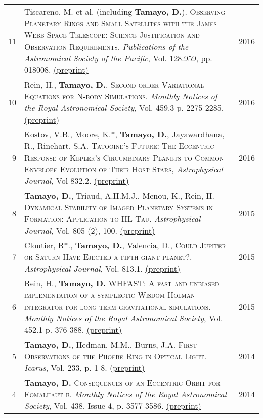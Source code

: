 \documentclass[10pt]{article} %
\begin{document}
\begin{tabular}{>{\hfill}r|p{14.3cm}l}
11 & Tiscareno, M. et al. (including {\bf Tamayo, D.}). \textsc{Observing Planetary Rings and Small Satellites with the James Webb Space Telescope: Science Justification and Observation Requirements}, {\it Publications of the Astronomical Society of the Pacific}, Vol. 128.959, pp. 018008. \href{https://arxiv.org/abs/1403.6849v3}{(preprint)} & 2016 \\

10 & Rein, H., {\bf Tamayo, D.}. \textsc{Second-order Variational Equations for N-body Simulations.} {\it Monthly Notices of the Royal Astronomical Society}, Vol. 459.3 p. 2275-2285. \href{http://arxiv.org/abs/1603.03424}{(preprint)} & 2016 \\

9 & Kostov, V.B., Moore, K.*, {\bf Tamayo, D.}, Jayawardhana, R., Rinehart, S.A. \textsc{Tatooine's Future: The Eccentric Response of Kepler's Circumbinary Planets to Common-Envelope Evolution of Their Host Stars}, {\it Astrophysical Journal}, Vol 832.2. \href{https://arxiv.org/abs/1610.03436}{(preprint)} & 2016 \\

8 & {\bf Tamayo, D.}, Triaud, A.H.M.J., Menou, K., Rein, H. \textsc{Dynamical Stability of Imaged Planetary Systems in Formation:  Application to HL Tau}. {\it Astrophysical Journal}, Vol. 805 (2), 100. \href{http://arxiv.org/abs/1502.05099}{(preprint)} & 2015 \\

7 & Cloutier, R*., {\bf Tamayo, D.}, Valencia, D., \textsc{Could Jupiter or Saturn Have Ejected a fifth giant planet?}.  {\it Astrophysical Journal}, Vol. 813.1. \href{http://arxiv.org/abs/1509.05397}{(preprint)} & 2015 \\

6 & Rein, H., {\bf Tamayo, D.} \textsc{WHFAST: A fast and unbiased implementation of a symplectic Wisdom-Holman integrator for long-term gravitational simulations}. {\it Monthly Notices of the Royal Astronomical Society}, Vol. 452.1 p. 376-388. \href{http://arxiv.org/abs/1506.01084}{(preprint)} & 2015 \\

5 & {\bf Tamayo, D.}, Hedman, M.M., Burns, J.A. \textsc{First Observations of the Phoebe Ring in Optical Light}. {\it Icarus}, Vol. 233, p. 1-8. \href{http://arxiv.org/abs/1401.6166}{(preprint)}& 2014  \\

4 & {\bf Tamayo, D.} \textsc{Consequences of an Eccentric Orbit for Fomalhaut b}. {\it Monthly Notices of the Royal Astronomical Society}, Vol. 438, Issue 4, p. 3577-3586. \href{http://arxiv.org/abs/1312.7020}{(preprint)} & 2014 \\


\end{tabular}
\end{document}

